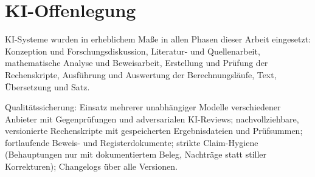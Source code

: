 \section*{KI-Offenlegung}

\noindent
KI-Systeme wurden in erheblichem Ma\ss{}e in allen Phasen dieser Arbeit
eingesetzt: Konzeption und Forschungsdiskussion, Literatur- und
Quellenarbeit, mathematische Analyse und Beweisarbeit, Erstellung und
Pr\"ufung der Rechenskripte, Ausf\"uhrung und Auswertung der
Berechnungsl\"aufe, Text, \"Ubersetzung und Satz.

\medskip

\noindent
Qualit\"atssicherung: Einsatz mehrerer unabh\"angiger Modelle
verschiedener Anbieter mit Gegenpr\"ufungen und adversarialen KI-Reviews;
nachvollziehbare, versionierte Rechenskripte mit gespeicherten
Ergebnisdateien und Pr\"ufsummen; fortlaufende Beweis- und
Registerdokumente; strikte Claim-Hygiene (Behauptungen nur mit
dokumentiertem Beleg, Nachtr\"age statt stiller Korrekturen); Changelogs
\"uber alle Versionen.
